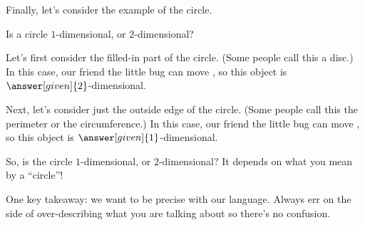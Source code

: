 \documentclass{ximera}
\begin{document}
Finally, let's consider the example of the circle.

\begin{example}
Is a circle $1$-dimensional, or $2$-dimensional?

Let's first consider the filled-in part of the circle. (Some people call this a disc.) In this case, our friend the little bug can move , so this object is $\answer[given]{2}$-dimensional.

Next, let's consider just the outside edge of the circle. (Some people call this the perimeter or the circumference.) In this case, our friend the little bug can move , so this object is $\answer[given]{1}$-dimensional.

So, is the circle $1$-dimensional, or $2$-dimensional? It depends on what you mean by a ``circle''!
\end{example}

One key takeaway: we want to be precise with our language. Always err on the side of over-describing what you are talking about so there's no confusion.
\end{document}
